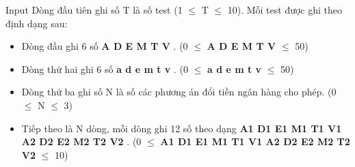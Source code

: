 Input
Dòng đầu tiên ghi số T là số test (1  $\le$  T  $\le$  10). Mỗi test được ghi theo định dạng sau:
\begin{itemize}
	\item Dòng đầu ghi 6 số \textbf{ A D E M T V } . (0  $\le$  \textbf{ A D E M T V }  $\le$  50)
	\item Dòng thứ hai ghi 6 số \textbf{ a d e m t v } . (0  $\le$  \textbf{ a d e m t v }  $\le$  50)
	\item Dòng thứ ba ghi số N là số các phương án đổi tiền ngân hàng cho phép. (0  $\le$  N  $\le$  3)
	\item Tiếp theo là N dòng, mỗi dòng ghi 12 số theo dạng \textbf{ A1 D1 E1 M1 T1 V1 A2 D2 E2 M2 T2 V2 } . (0  $\le$  \textbf{ A1 D1 E1 M1 T1 V1 A2 D2 E2 M2 T2 V2 }  $\le$  10)
\end{itemize}